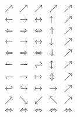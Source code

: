 \bigodot\documentclass[11pt]{article}
\begin{document}
\newpage
$$
\begin{array}{|c|c|c|c|c}
\nearrow & \nearrow & \nearrow & \nearrow & \nearrow \\\hline
\leftarrow & \rightarrow & \leftrightarrow & \uparrow & \nearrow \\\hline
\Leftarrow & \Rightarrow & \Leftrightarrow& \Uparrow & \nearrow \\\hline
\longleftarrow & \longrightarrow & \longleftrightarrow & \downarrow & \nearrow \\\hline
\Longleftarrow &\Longrightarrow & \Longleftrightarrow & \Downarrow & \nearrow \\\hline
\leftharpoonup & \rightharpoonup & \rightleftharpoons & \updownarrow & \nearrow \\\hline
\leftharpoondown & \rightharpoondown & \mapsto & \Updownarrow  & \nearrow \\\hline
\hookleftarrow & \hookrightarrow & \longmapsto & \to & \nearrow \\\hline
\nearrow & \searrow & \swarrow & \nwarrow & \nearrow \\\hline
\Longleftrightarrow & \Longleftrightarrow & \Longleftrightarrow & \Longleftrightarrow & \Longleftrightarrow
\end{array}
$$


 
\end{document}
